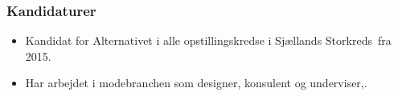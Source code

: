 \documentclass[11pt, a4paper]{awesome-cv}
\begin{document}
\begin{cvletter}
\subsubsection*{Kandidaturer}
\begin{itemize}
\item Kandidat for Alternativet i alle opstillingskredse i Sjællands Storkreds fra 2015.
\end{itemize}
\begin{itemize}
\item  Har arbejdet i modebranchen som designer, konsulent og underviser,.
\end{itemize}
\end{cvletter}
\end{document}
